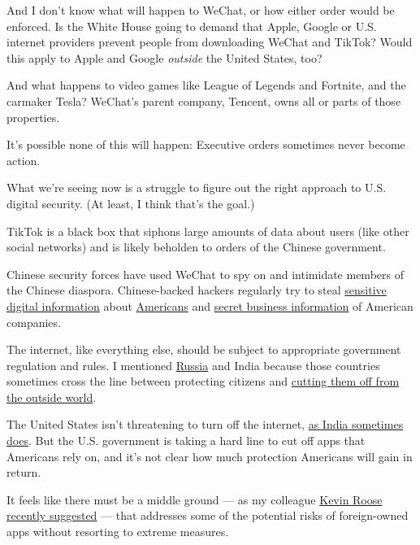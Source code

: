 And I don't know what will happen to WeChat, or how either order would
be enforced. Is the White House going to demand that Apple, Google or
U.S. internet providers prevent people from downloading WeChat and
TikTok? Would this apply to Apple and Google \emph{outside} the United
States, too?

And what happens to video games like League of Legends and Fortnite, and
the carmaker Tesla? WeChat's parent company, Tencent, owns all or parts
of those properties.

It's possible none of this will happen: Executive orders sometimes never
become action.

What we're seeing now is a struggle to figure out the right approach to
U.S. digital security. (At least, I think that's the goal.)

TikTok is a black box that siphons large amounts of data about users
(like other social networks) and is likely beholden to orders of the
Chinese government.

Chinese security forces have used WeChat to spy on and intimidate
members of the Chinese diaspora. Chinese-backed hackers regularly try to
steal
\href{https://www.nytimes.com/2015/06/05/us/breach-in-a-federal-computer-system-exposes-personnel-data.html}{sensitive
digital information} about
\href{https://www.nytimes.com/2020/02/10/us/politics/equifax-hack-china.html}{Americans}
and
\href{https://www.nytimes.com/2020/07/21/us/politics/china-hacking-coronavirus-vaccine.html}{secret
business information} of American companies.

The internet, like everything else, should be subject to appropriate
government regulation and rules. I mentioned
\href{https://www.nytimes.com/2018/04/18/world/europe/russia-telegram-shutdown.html}{Russia}
and India because those countries sometimes cross the line between
protecting citizens and
\href{https://www.nytimes.com/2019/02/14/technology/india-internet-censorship.html}{cutting
them off from the outside world}.

The United States isn't threatening to turn off the internet,
\href{https://www.nytimes.com/2020/01/26/world/asia/kashmir-internet-shutdown-india.html}{as
India sometimes does}. But the U.S. government is taking a hard line to
cut off apps that Americans rely on, and it's not clear how much
protection Americans will gain in return.

It feels like there must be a middle ground --- as my colleague
\href{https://www.nytimes.com/2020/07/26/technology/tiktok-china-ban-model.html}{Kevin
Roose recently suggested} --- that addresses some of the potential risks
of foreign-owned apps without resorting to extreme measures.

